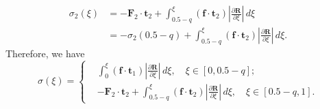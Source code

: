 \documentclass[lineno]{JFM-FLM_Au}
\begin{document}
\begin{equation}
	\begin{aligned}
		\label{eqn:97}
		\sigma_2(\xi)&=-\mathbf{F}_2\cdot\mathbf{t}_2+\int_{0.5-q}^\xi (\mathbf{f}\cdot\mathbf{t}_2) \left |\frac{\partial \mathbf{R}}{\partial \xi}\right|\,d\xi\\
		&=-\sigma_2(0.5-q)+\int_{0.5-q}^\xi (\mathbf{f}\cdot\mathbf{t}_2) \left |\frac{\partial \mathbf{R}}{\partial \xi}\right|\,d\xi.
	\end{aligned}
\end{equation}
Therefore, we have 
\begin{equation}
	\sigma(\xi)=\left\{
	\begin{aligned}
		\label{eqn:98}
		&\int_0^\xi (\mathbf{f}\cdot\mathbf{t}_1) \left |\frac{\partial \mathbf{R}}{\partial \xi}\right|\,d\xi,\quad \xi\in[0,0.5-q];\\
		&-\mathbf{F}_2\cdot\mathbf{t}_2+\int_{0.5-q}^\xi (\mathbf{f}\cdot\mathbf{t}_2) \left |\frac{\partial \mathbf{R}}{\partial \xi}\right|\,d\xi, \quad \xi\in[0.5-q,1].
	\end{aligned}\right.
\end{equation}
\end{document}
